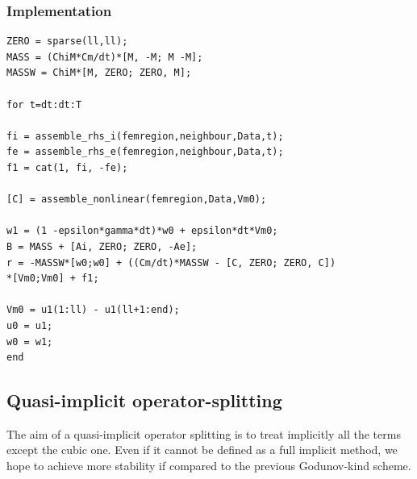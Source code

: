 \documentclass[a4paper,11pt]{article}
\begin{document}
\subsubsection{Implementation}
\begin{verbatim}
ZERO = sparse(ll,ll);
MASS = (ChiM*Cm/dt)*[M, -M; M -M];
MASSW = ChiM*[M, ZERO; ZERO, M];

for t=dt:dt:T

fi = assemble_rhs_i(femregion,neighbour,Data,t);
fe = assemble_rhs_e(femregion,neighbour,Data,t);
f1 = cat(1, fi, -fe);

[C] = assemble_nonlinear(femregion,Data,Vm0);

w1 = (1 -epsilon*gamma*dt)*w0 + epsilon*dt*Vm0;
B = MASS + [Ai, ZERO; ZERO, -Ae];
r = -MASSW*[w0;w0] + ((Cm/dt)*MASSW - [C, ZERO; ZERO, C])
*[Vm0;Vm0] + f1;

Vm0 = u1(1:ll) - u1(ll+1:end);
u0 = u1;
w0 = w1;
end
\end{verbatim}

\subsection{Quasi-implicit operator-splitting}
The aim of a quasi-implicit operator splitting is to treat implicitly all the terms except the cubic one. Even if it cannot be defined as a full implicit method, we hope to achieve more stability if compared to the previous Godunov-kind scheme.\newline
\end{document}
